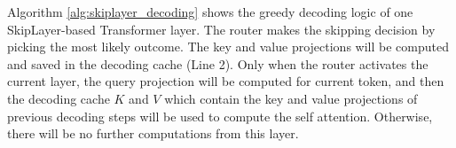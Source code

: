 \documentclass{article}
\newcommand{\skipl}{SkipLayer\xspace}
\begin{document}



Algorithm \ref{alg:skiplayer_decoding} shows the greedy decoding logic of one \skipl-based Transformer layer. The router makes the skipping decision by picking the most likely outcome. The key and value projections will be computed and saved in the decoding cache (Line 2). Only when the router activates the current layer, the query projection will be computed for current token, and then the decoding cache $K$ and $V$ which contain the key and value projections of previous decoding steps will be used to compute the self attention. Otherwise, there will be no further computations from this layer.
\end{document}
